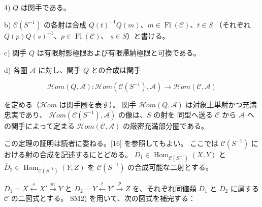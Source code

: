 \par\noindent\hspace*{2em}4) $Q$ は関手である。

\par\noindent b) $\mathcal C(S^{-1})$ の各射は合成
$Q(t)^{-1}Q(m)$、$m\in\operatorname{Fl}(\mathcal C)$、$t\in S$
（それぞれ $Q(p)Q(s)^{-1}$、$p\in\operatorname{Fl}(\mathcal C)$、
$s\in S$）と書ける。

\par\noindent c) 関手 $Q$ は有限射影極限および有限帰納極限と可換である。

\par\noindent d) 各圏 $\mathcal A$ に対し、関手 $Q$ との合成は関手

\[
  \mathcal{H}\!om(Q,\mathcal A)\colon
  \mathcal{H}\!om(\mathcal C(S^{-1}),\mathcal A)
  \longrightarrow \mathcal{H}\!om(\mathcal C,\mathcal A)
\]

\noindent\textup{を定める（$\mathcal{H}\!om$ は関手圏を表す）。}
%
関手 $\mathcal{H}\!om(Q,\mathcal A)$ は対象上単射かつ充満忠実であり、
$\mathcal{H}\!om(\mathcal C(S^{-1}),\mathcal A)$ の像は、$S$ の射を
同型へ送る $\mathcal C$ から $\mathcal A$ への関手によって定まる
$\mathcal{H}\!om(\mathcal C,\mathcal A)$ の厳密充満部分圏である。
\par\endgroup

この定理の証明は読者に委ねる。[16] を参照してもよい。
%
ここでは $\mathcal C(S^{-1})$ における射の合成を記述するにとどめる。
$\overline D_1\in\operatorname{Hom}_{\mathcal C(S^{-1})}(X,Y)$ と
$\overline D_2\in\operatorname{Hom}_{\mathcal C(S^{-1})}(Y,Z)$ を
$\mathcal C(S^{-1})$ の合成可能な二射とする。

$D_1=X\xleftarrow{s}X'\xrightarrow{m}Y$ と
$D_2=Y\xleftarrow{t}Y'\xrightarrow{p}Z$ を、それぞれ同値類
$\overline D_1$ と $\overline D_2$ に属する $\mathcal C$ の二図式とする。
%
SM2) を用いて、次の図式を補完する：

\begin{center}
\end{center}

\endgroup
